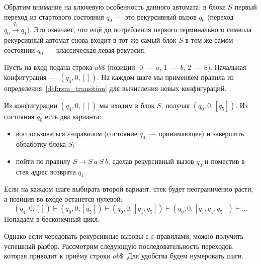 Обратим внимание на ключевую особенность данного автомата: в блоке $S$ первый переход из стартового состояния $q_0$~--- это рекурсивный вызов $q_0$ (переход $q_0 \xrightarrow{q_0} q_1$).
Это означает, что ещё до потребления первого терминального символа рекурсивный автомат снова входит в тот же самый блок $S$ в том же самом состоянии $q_0$~--- классическая левая рекурсия.

Пусть на вход подана строка $ab\$$ (позиции: $0$~--- $a$, $1$~--- $b$, $2$~--- $\$$).
Начальная конфигурация~--- $(q_4,0,[])$.
На каждом шаге мы применяем правила из определения~\ref{def:rsm_transition} для вычисления новых конфигураций.

Из конфигурации $(q_4,0,[])$ мы входим в блок $S$, получая $(q_0,0,[q_5])$.
Из состояния $q_0$ есть два варианта:
\begin{itemize}
    \item воспользоваться $\varepsilon$-правилом (состояние $q_0$~--- принимающее) и завершить обработку блока $S$;
    \item пойти по правилу $S \to S \ a \ S \ b$, сделав рекурсивный вызов $q_0$ и поместив в стек адрес возврата $q_1$.
\end{itemize}

Если на каждом шаге выбирать второй вариант, стек будет неограниченно расти, а позиция во входе останется нулевой:
\[
    (q_4,0,[]) \vdash (q_0,0,[q_5]) \vdash (q_0,0,[q_1,q_5]) \vdash (q_0,0,[q_1,q_1,q_5]) \vdash \dots
\]
Попадаем в бесконечный цикл.

Однако если чередовать рекурсивные вызовы с $\varepsilon$-правилами, можно получить успешный разбор.
Рассмотрим следующую последовательность переходов, которая приводит к приёму строки $ab\$$.
Для удобства будем нумеровать шаги.

